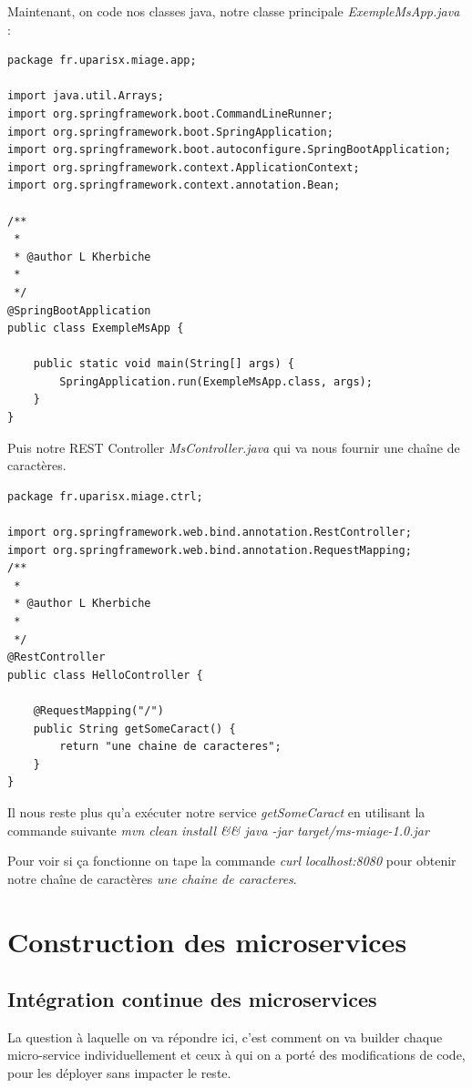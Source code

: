 \documentclass[12pt, a4paper, openany]{report}
\begin{document}
\begin{appendices}
 Maintenant, on code nos classes java, notre classe principale \textit{ExempleMsApp.java} :
 
\begin{lstlisting}
package fr.uparisx.miage.app;

import java.util.Arrays;
import org.springframework.boot.CommandLineRunner;
import org.springframework.boot.SpringApplication;
import org.springframework.boot.autoconfigure.SpringBootApplication;
import org.springframework.context.ApplicationContext;
import org.springframework.context.annotation.Bean;

/**
 * 
 * @author L Kherbiche
 *
 */
@SpringBootApplication
public class ExempleMsApp {

    public static void main(String[] args) {
        SpringApplication.run(ExempleMsApp.class, args);
    }
}
\end{lstlisting}

 Puis notre REST Controller \textit{MsController.java} qui va nous fournir une chaîne de caractères.
\begin{lstlisting}
package fr.uparisx.miage.ctrl;

import org.springframework.web.bind.annotation.RestController;
import org.springframework.web.bind.annotation.RequestMapping;
/**
 * 
 * @author L Kherbiche
 *
 */
@RestController
public class HelloController {

    @RequestMapping("/")
    public String getSomeCaract() {
        return "une chaine de caracteres";
    }
}
\end{lstlisting}
 
 Il nous reste plus qu'a exécuter notre service \textit{getSomeCaract} en utilisant la commande suivante 
 \textit{mvn clean install \&\& java -jar target/ms-miage-1.0.jar}
 
 Pour voir si ça fonctionne on tape la commande \textit{curl localhost:8080} pour obtenir notre chaîne de caractères 
\textit{une chaine de caracteres}.


\chapter{Construction des microservices} %
 
 \section{Intégration continue des microservices}
 
   La question à laquelle on va répondre ici, c'est comment on va builder chaque micro-service individuellement et ceux à qui on a porté des modifications de code, pour les déployer sans impacter le reste. \\
  

\end{appendices}
\end{document}
